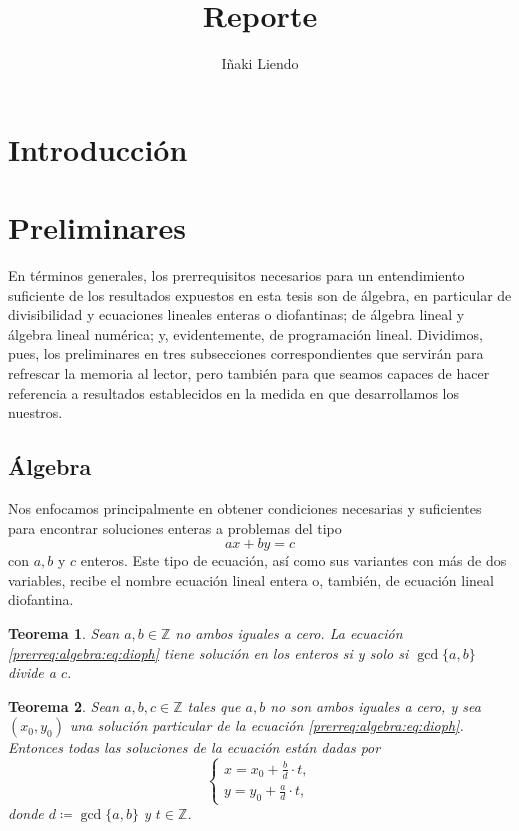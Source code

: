 \documentclass[11pt]{article}
\title{Reporte}
\author{Iñaki Liendo}
\newtheorem{theorem}{Teorema}
\begin{document}
\maketitle

\begin{abstract}
\end{abstract}

\section*{Introducción}
\section*{Preliminares}  %
En términos generales, los prerrequisitos necesarios para un entendimiento suficiente de los
resultados expuestos en esta tesis son de álgebra, en particular de divisibilidad y ecuaciones
lineales enteras o diofantinas; de álgebra lineal y álgebra lineal numérica; y, evidentemente,
de programación lineal. Dividimos, pues, los preliminares en tres subsecciones correspondientes que
servirán para refrescar la memoria al lector, pero también para que seamos capaces de hacer
referencia a resultados establecidos en la medida en que desarrollamos los nuestros.

\subsection*{Álgebra}
Nos enfocamos principalmente en obtener condiciones necesarias y suficientes para encontrar
soluciones enteras a problemas del tipo
\begin{equation}
	\label{prerreq:algebra:eq:dioph}
	ax + by = c
\end{equation}
con $a, b$ y $c$ enteros. Este tipo de ecuación, así como sus variantes con más de dos variables,
recibe el nombre ecuación lineal entera o, también, de ecuación lineal diofantina.

\begin{theorem}
	\label{prerreq:th:dioph:existence}
	Sean $a, b \in \mathbb{Z}$ no ambos iguales a cero. La ecuación \ref{prerreq:algebra:eq:dioph}
	tiene solución en los enteros si y solo si $\gcd\lbrace a, b \rbrace$ divide a $c$.
\end{theorem}

\begin{theorem}
	\label{prerreq:th:dioph:gen}
	Sean $a, b, c \in \mathbb{Z}$ tales que $a, b$ no son ambos iguales a cero, y sea $(x_0, y_0)$ una
	solución particular de la ecuación \ref{prerreq:algebra:eq:dioph}. Entonces todas las soluciones
	de la ecuación están dadas por
	\begin{equation*}
		\begin{cases}
			x = x_0 + \frac{b}{d} \cdot t, \\
			y = y_0 + \frac{a}{d} \cdot t,
		\end{cases}
	\end{equation*}
	donde $d \coloneq \gcd\lbrace a, b \rbrace$ y $t \in \mathbb{Z}$.
\end{theorem}
\end{document}
